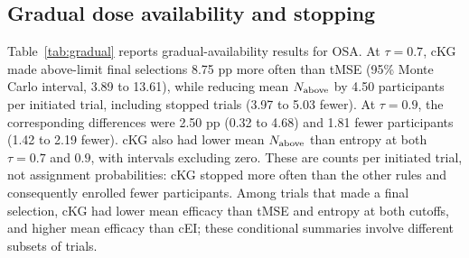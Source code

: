 \documentclass[11pt]{article}
\newcommand{\rev}[1]{{#1}}
\begin{document}
\subsection{Gradual dose availability and stopping}

Table~\ref{tab:gradual} reports gradual-availability results for OSA. At $\tau=0.7$, cKG made above-limit final selections 8.75 \rev{pp} more often than tMSE (95\% Monte Carlo interval, 3.89 to 13.61), \rev{while reducing mean $N_{\rm above}$ by 4.50 participants per initiated trial, including stopped trials (3.97 to 5.03 fewer).} At $\tau=0.9$, the corresponding differences were 2.50 \rev{pp} (0.32 to 4.68) and 1.81 fewer participants (1.42 to 2.19 fewer). \rev{cKG also had lower mean $N_{\rm above}$ than entropy at both $\tau=0.7$ and $0.9$, with intervals excluding zero.} \rev{These are counts per initiated trial, not assignment probabilities: cKG stopped more often than the other rules and consequently enrolled fewer participants. Among trials that made a final selection, cKG had lower mean efficacy than tMSE and entropy at both cutoffs, and higher mean efficacy than cEI; these conditional summaries involve different subsets of trials.}
\end{document}
